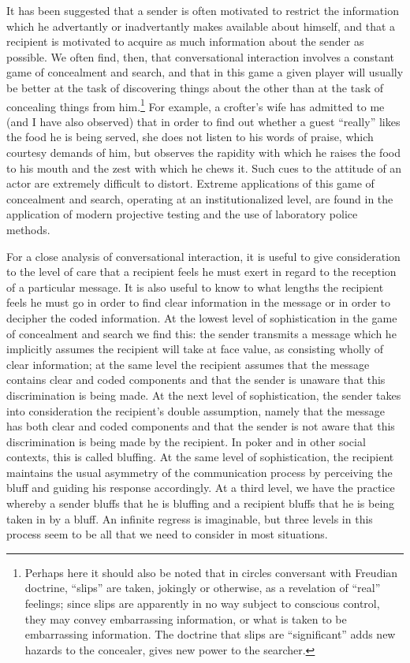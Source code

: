 \documentclass[openany,nobib]{tufte-book}
\begin{document}
It has been suggested that a sender is often motivated to restrict the
information which he advertantly or inadvertantly makes available about
himself, and that a recipient is motivated to acquire as much
information about the sender as possible. We often find, then, that
conversational interaction involves a constant game of concealment and
search, and that in this game a given player will usually be better at
the task of discovering things about the other than at the task of
concealing things from him.\footnote{Perhaps here it should also be
  noted that in circles conversant with Freudian doctrine, ``slips'' are
  taken, jokingly or otherwise, as a revelation of ``real'' feelings;
  since slips are apparently in no way subject to conscious control,
  they may con­vey embarrassing information, or what is taken to be
  embarrassing information. The doctrine that slips are ``significant''
  adds new hazards to the concealer, gives new power to the searcher.}
For example, a crofter's wife has admitted to me (and I have also
observed) that in order to find out whether a guest ``really'' likes the
food he is being served, she does not listen to his words of praise,
which courtesy demands of him, but observes the rapidity with which he
raises the food to his mouth and the zest with which he chews it. Such
cues to the attitude of an actor are extremely difficult to distort.
Extreme applications of this game of concealment and search, operating
at an institutionalized level, are found in the application of modern
projective testing and the use of laboratory police methods.

For a close analysis of conversational interaction, it is useful to give
consideration to the level of care that a re­cipient feels he must exert
in regard to the reception of a par­ticular message. It is also useful to
know to what lengths the recipient feels he must go in order to find
clear information in the message or in order to decipher the coded
information. At the lowest level of sophistication in the game of
concealment and search we find this: the sender transmits a message
which he implicitly assumes the recipient will take at face value, as
consisting wholly of clear information; at the same level the recipient
assumes that the message contains clear and coded com­ponents and that
the sender is unaware that this discrimination is being made. At the
next level of sophistication, the sender takes into consideration the
recipient's double assumption, namely that the message has both clear
and coded components and that the sender is not aware that this
discrimination is being made by the recipient. In poker and in other
social contexts, this is called bluffing. At the same level of
sophistication, the re­cipient maintains the usual asymmetry of the
communication proc­ess by perceiving the bluff and guiding his response
accordingly. At a third level, we have the practice whereby a sender
bluffs that he is bluffing and a recipient bluffs that he is being taken
in by a bluff. An infinite regress is imaginable, but three levels in
this process seem to be all that we need to con­sider in most situations.
\end{document}

